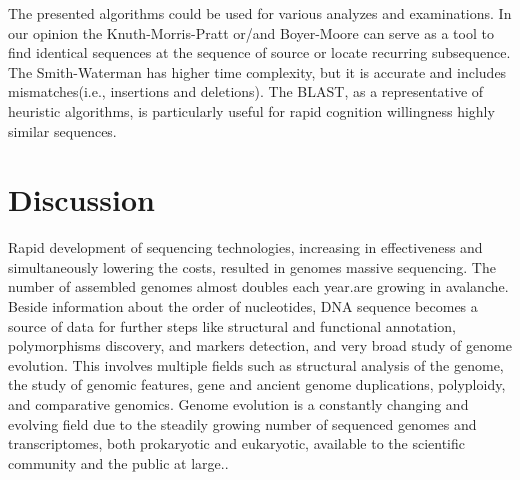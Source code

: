 \documentclass[a4paper]{spie}
\begin{document}
The presented algorithms could be used for various analyzes and examinations.
In our opinion the Knuth-Morris-Pratt or/and Boyer-Moore can serve as a tool to find identical sequences
at the sequence of source or locate recurring subsequence.
The Smith-Waterman has higher time complexity, but it is accurate and includes mismatches(i.e., insertions and deletions).
The BLAST, as a representative of heuristic algorithms, is particularly useful for rapid cognition willingness highly similar sequences.

\section{Discussion}

Rapid development of sequencing technologies, increasing in effectiveness and simultaneously lowering the costs, resulted in genomes massive sequencing. The number of assembled genomes almost doubles each year.are growing in avalanche.
Beside information about the order of nucleotides,
DNA sequence becomes a source of data for further steps like structural and functional annotation, polymorphisms discovery, and markers detection, and very broad study of genome evolution. This involves multiple fields such as structural analysis of the genome, the study of genomic features, gene and ancient genome duplications, polyploidy, and comparative genomics. Genome evolution is a constantly changing and evolving field due to the steadily growing number of sequenced genomes and transcriptomes, both prokaryotic and eukaryotic, available to the scientific community and the public at large..
\end{document}
